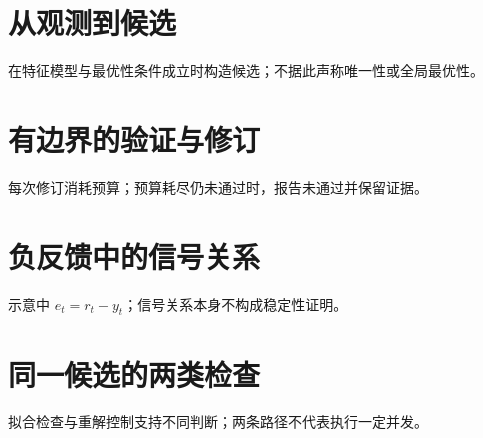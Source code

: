 \documentclass[UTF8,fontset=fandol]{ctexart}
\begin{document}
\section*{从观测到候选}
\begin{center}\end{center}
在特征模型与最优性条件成立时构造候选；不据此声称唯一性或全局最优性。
\clearpage
\section*{有边界的验证与修订}
\begin{center}\end{center}
每次修订消耗预算；预算耗尽仍未通过时，报告未通过并保留证据。
\clearpage
\section*{负反馈中的信号关系}
\begin{center}\end{center}
示意中 $e_t=r_t-y_t$；信号关系本身不构成稳定性证明。
\clearpage
\section*{同一候选的两类检查}
\begin{center}\end{center}
拟合检查与重解控制支持不同判断；两条路径不代表执行一定并发。
\end{document}

